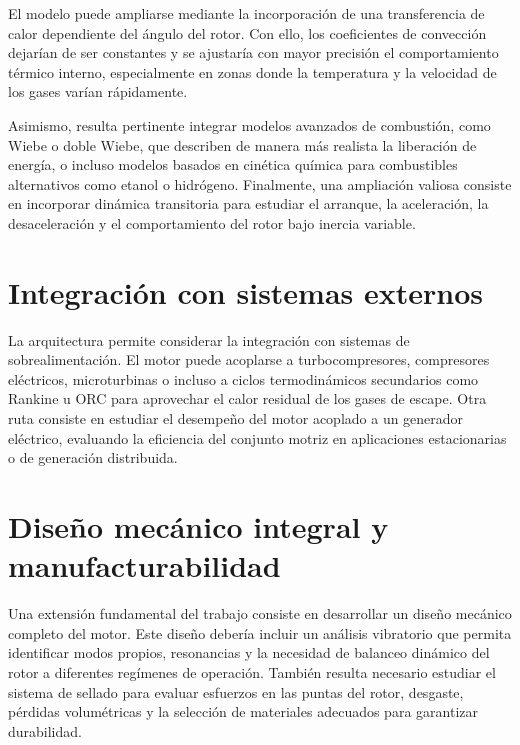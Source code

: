 \documentclass[a4paper,12pt]{article}
\begin{document}
El modelo puede ampliarse mediante la incorporación de una transferencia de calor dependiente del ángulo del rotor. Con ello, los coeficientes de convección dejarían de ser constantes y se ajustaría con mayor precisión el comportamiento térmico interno, especialmente en zonas donde la temperatura y la velocidad de los gases varían rápidamente.

Asimismo, resulta pertinente integrar modelos avanzados de combustión, como Wiebe o doble Wiebe, que describen de manera más realista la liberación de energía, o incluso modelos basados en cinética química para combustibles alternativos como etanol o hidrógeno. Finalmente, una ampliación valiosa consiste en incorporar dinámica transitoria para estudiar el arranque, la aceleración, la desaceleración y el comportamiento del rotor bajo inercia variable.

\section{Integración con sistemas externos}

La arquitectura permite considerar la integración con sistemas de sobrealimentación. El motor puede acoplarse a turbocompresores, compresores eléctricos, microturbinas o incluso a ciclos termodinámicos secundarios como Rankine u ORC para aprovechar el calor residual de los gases de escape. Otra ruta consiste en estudiar el desempeño del motor acoplado a un generador eléctrico, evaluando la eficiencia del conjunto motriz en aplicaciones estacionarias o de generación distribuida.

\section{Diseño mecánico integral y manufacturabilidad}

Una extensión fundamental del trabajo consiste en desarrollar un diseño mecánico completo del motor. Este diseño debería incluir un análisis vibratorio que permita identificar modos propios, resonancias y la necesidad de balanceo dinámico del rotor a diferentes regímenes de operación. También resulta necesario estudiar el sistema de sellado para evaluar esfuerzos en las puntas del rotor, desgaste, pérdidas volumétricas y la selección de materiales adecuados para garantizar durabilidad.
\end{document}

